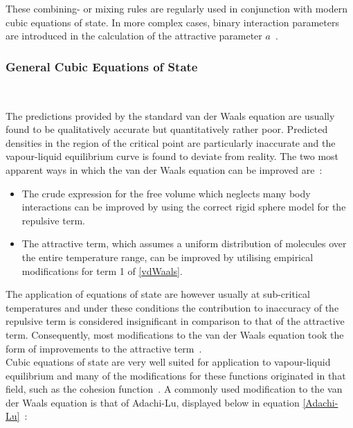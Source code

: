 These combining- or mixing rules are regularly used in conjunction with modern cubic equations of state. In more complex cases, binary interaction parameters are introduced in the calculation of the attractive parameter $a$~\cite{ThermophysicalProperties}.\

\subsubsection{General Cubic Equations of State}\

The predictions provided by the standard van der Waals equation are usually found to be qualitatively accurate but quantitatively rather poor. Predicted densities in the region of the critical point are particularly inaccurate and the vapour-liquid equilibrium curve is found to deviate from reality. The two most apparent ways in which the van der Waals equation can be improved are~\cite{ThermophysicalProperties, ThermodynamicModels}:\
\begin{itemize}
\item The crude expression for the free volume which neglects many body interactions can be improved by using the correct rigid sphere model for the repulsive term.\
\item The attractive term, which assumes a uniform distribution of molecules over the entire temperature range, can be improved by utilising empirical modifications for term 1 of \ref{vdWaals}.\
\end{itemize}

The application of equations of state are however usually at sub-critical temperatures and under these conditions the contribution to inaccuracy of the repulsive term is considered insignificant in comparison to that of the attractive term. Consequently, most modifications to the van der Waals equation took the form of improvements to the attractive term~\cite{ThermophysicalProperties, EOSModification}.\\

Cubic equations of state are very well suited for application to vapour-liquid equilibrium and many of the modifications for these functions originated in that field, such as the cohesion function~\cite{Parsafar}. A commonly used modification to the van der Waals equation is that of Adachi-Lu, displayed below in equation \ref{Adachi-Lu}~\cite{Adachi-Lu}:\

